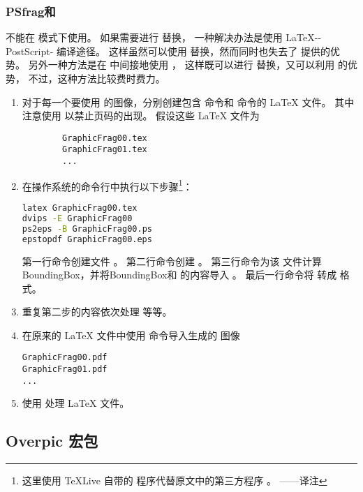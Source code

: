 \subsubsection{PSfrag和 \pdfTeX{}}

 不能在 \pdfTeX{} 模式下使用。
如果需要进行  替换，
一种解决办法是使用 \LaTeX{}--PostScript- 编译途径。
这样虽然可以使用  替换，然而同时也失去了 \pdfTeX{} 提供的优势。
另外一种方法是在 \pdfTeX{} 中间接地使用 ，
这样既可以进行  替换，又可以利用 \pdfTeX{} 的优势，
不过，这种方法比较费时费力。
\begin{enumerate}
	\item 对于每一个要使用  的图像，分别创建包含  命令和  命令的 \LaTeX{} 文件。
	其中注意使用  以禁止页码的出现。
	假设这些 \LaTeX{} 文件为
\begin{verbatim}
		GraphicFrag00.tex
		GraphicFrag01.tex
		...
\end{verbatim}
	\item 在操作系统的命令行中执行以下步骤\footnote{%
		这里使用 \TeX Live 自带的  程序代替原文中的第三方程序 。
		——译注}：
\begin{lstlisting}[language=bash]
latex GraphicFrag00.tex
dvips -E GraphicFrag00
ps2eps -B GraphicFrag00.ps
epstopdf GraphicFrag00.eps
\end{lstlisting}
	第一行命令创建文件 。
	第二行命令创建 。
	第三行命令为该  文件计算 BoundingBox，并将BoundingBox和  的内容导入 。
	最后一行命令将  转成  格式。
	\item 重复第二步的内容依次处理  等等。
	\item 在原来的 \LaTeX{} 文件中使用  命令导入生成的  图像
\begin{verbatim}
GraphicFrag00.pdf
GraphicFrag01.pdf
...
\end{verbatim}
	\item 使用  处理 \LaTeX{} 文件。
\end{enumerate}


\subsection{Overpic 宏包}\label{ssec:overpic}

